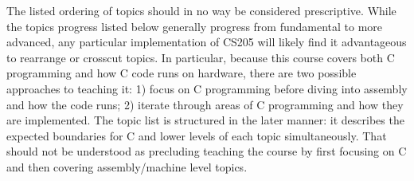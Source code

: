 \documentclass[12pt,letterpaper]{article}
\begin{document}
	

	The listed ordering of topics should in no way be considered prescriptive. While the topics progress listed below generally progress from fundamental to more advanced, any particular implementation of CS205 will likely find it advantageous to rearrange or crosscut topics. In particular, because this course covers both C programming and how C code runs on hardware, there are two possible approaches to teaching it: 1) focus on C programming before diving into assembly and how the code runs; 2) iterate through areas of C programming and how they are implemented. The topic list is structured in the later manner: it describes the expected boundaries for C and lower levels of each topic simultaneously. That should not be understood as precluding teaching the course by first focusing on C and then covering assembly/machine level topics.
\end{document}
